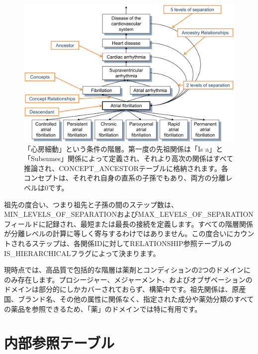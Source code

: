 \documentclass[
  11pt]{book}
\theoremstyle{definition}
\theoremstyle{definition}
\theoremstyle{definition}
\theoremstyle{definition}
\theoremstyle{remark}
\begin{document}
\begin{figure}

{\centering \includegraphics[width=1\linewidth]{images/StandardizedVocabularies/conceptAncestor} 

}

\caption{「心房細動」という条件の階層。第一度の先祖関係は「Is a」と「Subsumes」関係によって定義され、それより高次の関係はすべて推論され、CONCEPT\_ANCESTORテーブルに格納されます。各コンセプトは、それぞれ自身の直系の子孫でもあり、両方の分離レベルは0です。 }\label{fig:conceptAncestor}
\end{figure}

祖先の度合い、つまり祖先と子孫の間のステップ数は、MIN\_LEVELS\_OF\_SEPARATIONおよびMAX\_LEVELS\_OF\_SEPARATIONフィールドに記録され、最短または最長の接続を定義します。すべての階層関係が分離レベルの計算に等しく寄与するわけではありません。この度合いにカウントされるステップは、各関係IDに対してRELATIONSHIP参照テーブルのIS\_HIERARCHICALフラグによって決まります。

現時点では、高品質で包括的な階層は薬剤とコンディションの2つのドメインにのみ存在します。プロシージャー、メジャーメント、およびオブザベーションのドメインは部分的にしかカバーされておらず、構築中です。祖先関係は、原産国、ブランド名、その他の属性に関係なく、指定された成分や薬効分類のすべての薬品を参照できるため、「薬」のドメインでは特に有用です。

\section{内部参照テーブル}\label{ux5185ux90e8ux53c2ux7167ux30c6ux30fcux30d6ux30eb}
\end{document}
